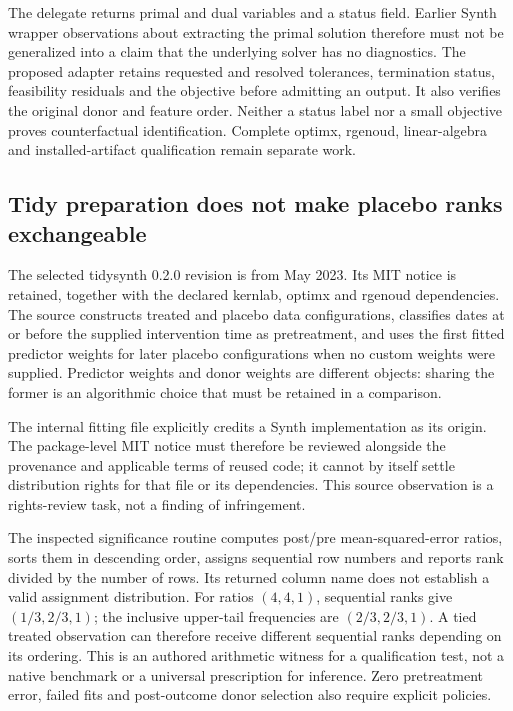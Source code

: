 The delegate returns primal and dual variables and a status field. Earlier
Synth wrapper observations about extracting the primal solution therefore
must not be generalized into a claim that the underlying solver has no
diagnostics. The proposed adapter retains requested and resolved tolerances,
termination status, feasibility residuals and the objective before admitting
an output. It also verifies the original donor and feature order. Neither a
status label nor a small objective proves counterfactual identification.
Complete optimx, rgenoud, linear-algebra and installed-artifact qualification
remain separate work.~\citep{exec25_synthr_kernlab,exec24_synth_source,
exec25_synthr_choice}

\subsection{Tidy preparation does not make placebo ranks exchangeable}
The selected tidysynth 0.2.0 revision is from May 2023. Its MIT notice is
retained, together with the declared kernlab, optimx and rgenoud dependencies.
The source constructs treated and placebo data configurations, classifies
dates at or before the supplied intervention time as pretreatment, and uses
the first fitted predictor weights for later placebo configurations when no
custom weights were supplied. Predictor weights and donor weights are
different objects: sharing the former is an algorithmic choice that must
be retained in a comparison.~\citep{exec25_synthr_tidysynth}

The internal fitting file explicitly credits a Synth implementation as its
origin. The package-level MIT notice must therefore be reviewed alongside
the provenance and applicable terms of reused code; it cannot by itself
settle distribution rights for that file or its dependencies. This source
observation is a rights-review task, not a finding of infringement.
\citep{exec25_synthr_tidysynth,exec24_synth_source}

The inspected significance routine computes post/pre mean-squared-error
ratios, sorts them in descending order, assigns sequential row numbers and
reports rank divided by the number of rows. Its returned column name does
not establish a valid assignment distribution. For ratios $(4,4,1)$, sequential
ranks give $(1/3,2/3,1)$; the inclusive upper-tail frequencies are
$(2/3,2/3,1)$. A tied treated observation can therefore receive different
sequential ranks depending on its ordering. This is an authored arithmetic
witness for a qualification test, not a native benchmark or a universal
prescription for inference. Zero pretreatment error, failed fits and
post-outcome donor selection also require explicit policies.
\citep{exec25_synthr_tidysynth,exec25_synthr_choice}

